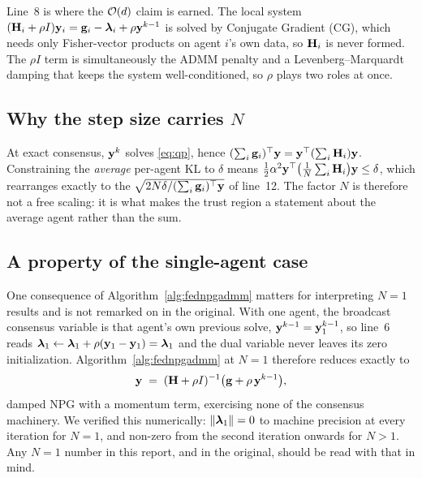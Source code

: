 Line~8 is where the $\mathcal{O}(d)$ claim is earned. The local system $(\mathbf{H}_i + \rho
I)\mathbf{y}_i = \mathbf{g}_i - \boldsymbol{\lambda}_i + \rho\mathbf{y}^{k-1}$ is solved by Conjugate Gradient (CG),
which needs only Fisher-vector products on agent $i$'s own data, so $\mathbf{H}_i$ is
never formed. The $\rho I$ term is simultaneously the ADMM penalty and a
Levenberg--Marquardt damping that keeps the system well-conditioned, so $\rho$
plays two roles at once.

\subsection{Why the step size carries \texorpdfstring{$N$}{N}}

At exact consensus, $\mathbf{y}^k$ solves \eqref{eq:qp}, hence $(\sum_i
\mathbf{g}_i)^{\top}\mathbf{y} = \mathbf{y}^{\top}(\sum_i \mathbf{H}_i)\mathbf{y}$. Constraining the
\emph{average} per-agent KL to $\delta$ means
$\tfrac12 \alpha^2 \mathbf{y}^{\top}\big(\tfrac{1}{N}\sum_i\mathbf{H}_i\big)\mathbf{y} \le \delta$,
which rearranges exactly to the $\sqrt{2N\delta/(\sum_i\mathbf{g}_i)^\top\mathbf{y}}$ of
line~12. The factor $N$ is therefore not a free scaling: it is what makes the
trust region a statement about the average agent rather than the sum.

\subsection{A property of the single-agent case}

One consequence of Algorithm~\ref{alg:fednpgadmm} matters for interpreting
$N=1$ results and is not remarked on in the original. With one agent, the
broadcast consensus variable is that agent's own previous solve, $\mathbf{y}^{k-1} =
\mathbf{y}_1^{k-1}$, so line~6 reads $\boldsymbol{\lambda}_1 \leftarrow \boldsymbol{\lambda}_1 + \rho(\mathbf{y}_1 -
\mathbf{y}_1) = \boldsymbol{\lambda}_1$ and the dual variable never leaves its zero initialization.
Algorithm~\ref{alg:fednpgadmm} at $N = 1$ therefore reduces exactly to
\begin{equation}
  \mathbf{y} \;=\; (\mathbf{H} + \rho I)^{-1}\big(\mathbf{g} + \rho\,\mathbf{y}^{k-1}\big),
\end{equation}
damped NPG with a momentum term, exercising none of the consensus machinery.
We verified this numerically: $\|\boldsymbol{\lambda}_1\| = 0$ to machine precision at every
iteration for $N=1$, and non-zero from the second iteration onwards for $N >
1$. Any $N = 1$ number in this report, and in the original, should be read
with that in mind.
